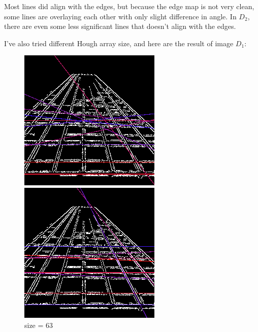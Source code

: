 \documentclass[12pt,a4paper,notitlepage,oneside,amsmath,amssymb]{article}
\begin{document}
\begin{CJK*}{UTF8}{bkai}
\begin{enumerate}[label=(\alph*)]
		      Most lines did align with the edges, but because the edge map is not very clean, some lines are overlaying each other with only slight difference in angle. In \(D_2\), there are even some less significant lines that doesn't align with the edges.

		      I've also tried different Hough array size, and here are the result of image \(D_1\):

		      \begin{figure}[hbt!]
			      \centering
			      \begin{minipage}{.3\textwidth}
				      \centering
				      \includegraphics[width=.9\linewidth]{image_D1_63}
				      \caption*{size = 63}
			      \end{minipage}%
			      \begin{minipage}{.3\textwidth}
				      \centering
				      \includegraphics[width=.9\linewidth]{image_D1}

\end{minipage}
\end{figure}
\end{enumerate}
\end{CJK*}
\end{document}
